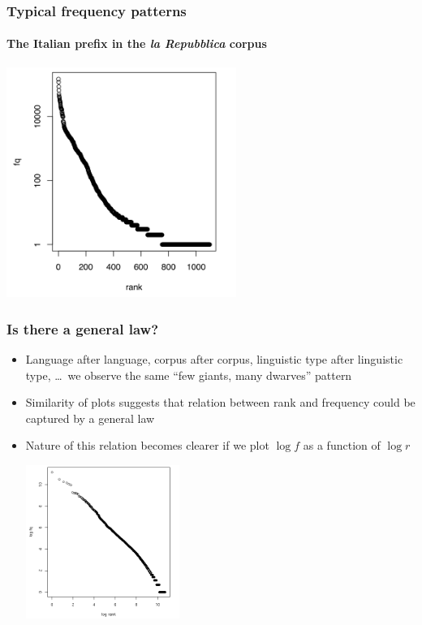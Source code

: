 \documentclass[handout,notes=show,t]{beamer} %
\begin{document}
\begin{frame}
  \frametitle{Typical frequency patterns} 
  \framesubtitle{The Italian prefix \textcite{ri-} in the \emph{la Repubblica} corpus}

  \begin{center}
    \includegraphics[height=7.5cm]{img/ita-ri-rf}
  \end{center}
\end{frame}

\begin{frame}
  \frametitle{Is there a general law?}

  \begin{itemize}
  \item Language after language, corpus after corpus, linguistic type after
    linguistic type, \ldots\ we observe the same ``few giants, many dwarves'' pattern 
  \item Similarity of plots suggests that relation between rank and
    frequency could be captured by a general law%
    \pause
  \item Nature of this relation becomes clearer if we plot $\log f$ as a
    function of $\log r$ %
    \vspace{-5mm}
    \begin{center}
      \hspace{2cm}
      \includegraphics[height=50mm]{img/brown-loglog-rf}
    \end{center}
  \end{itemize}

\end{frame}
\end{document}
